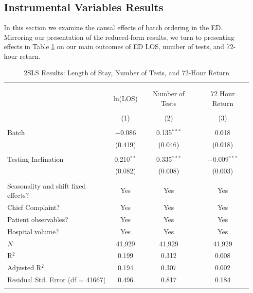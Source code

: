 \documentclass[,,nonblindrev]{informs}
\begin{document}
\hypertarget{instrumental-variables-results}{%
\subsection{Instrumental Variables
Results}\label{instrumental-variables-results}}

In this section we examine the causal effects of batch ordering in the
ED. Mirroring our presentation of the reduced-form results, we turn to
presenting effects in Table \ref{tab:2SLS} on our main outcomes of ED
LOS, number of tests, and 72-hour return.

\begin{table}[!htbp] \centering 
  \caption{2SLS Results: Length of Stay, Number of Tests, and 72-Hour Return} 
  \label{tab:2SLS} 
\begin{tabular}{p{7cm}ccc}
\\[-1.8ex]\hline 
\hline \\[-1.8ex] 
\\[-1.8ex] & ln(LOS) & Number of Tests & 72 Hour Return \\ 
\\[-1.8ex] & (1) & (2) & (3)\\ 
\hline \\[-1.8ex] 
 Batch & $-$0.086 & 0.135$^{***}$ & 0.018 \\ 
  & (0.419) & (0.046) & (0.018) \\ 
  & & & \\ 
 Testing Inclination & 0.210$^{**}$ & 0.335$^{***}$ & $-$0.009$^{***}$ \\ 
  & (0.082) & (0.008) & (0.003) \\ 
  & & & \\ 
Seasonality and shift fixed effects? & Yes & Yes & Yes \\
Chief Complaint? & Yes & Yes & Yes \\
Patient observables? & Yes & Yes & Yes \\
Hospital volume? & Yes & Yes & Yes \\
\midrule
\textit{N} & 41,929 & 41,929 & 41,929 \\ 
R$^{2}$ & 0.199 & 0.312 & 0.008 \\ 
Adjusted R$^{2}$ & 0.194 & 0.307 & 0.002 \\ 
Residual Std. Error (df = 41667) & 0.496 & 0.817 & 0.184 \\ 
\\
\bottomrule
\end{tabular}
\begin{tablenotes}

\end{tablenotes}
\end{table}
\end{document}
